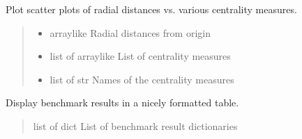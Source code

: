 \documentclass[letterpaper,10pt,english]{sphinxmanual}
\begin{document}

\begin{fulllineitems}
\label{\detokenize{api_reference:id72}}
\pysigstartsignatures
{}
\pysigstopsignatures
\sphinxAtStartPar
Plot scatter plots of radial distances vs. various centrality measures.
\begin{quote}\begin{description}
\begin{itemize}
\item {} 
\sphinxAtStartPar
{} \textendash{} array\sphinxhyphen{}like
Radial distances from origin

\item {} 
\sphinxAtStartPar
{} \textendash{} list of array\sphinxhyphen{}like
List of centrality measures

\item {} 
\sphinxAtStartPar
{} \textendash{} list of str
Names of the centrality measures

\end{itemize}

\end{description}\end{quote}

\end{fulllineitems}


\begin{fulllineitems}
\label{\detokenize{api_reference:id73}}
\pysigstartsignatures
{}
\pysigstopsignatures
\sphinxAtStartPar
Display benchmark results in a nicely formatted table.
\begin{quote}\begin{description}
\sphinxAtStartPar
{} \textendash{} list of dict
List of benchmark result dictionaries

\end{description}\end{quote}

\end{fulllineitems}
\end{document}
